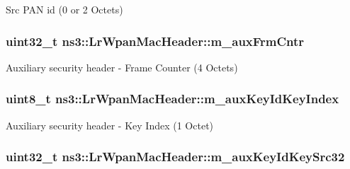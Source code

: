 Src P\+AN id (0 or 2 Octets) 

\subsubsection[{\texorpdfstring{m\+\_\+aux\+Frm\+Cntr}{m_auxFrmCntr}}]{\setlength{\rightskip}{0pt plus 5cm}uint32\+\_\+t ns3\+::\+Lr\+Wpan\+Mac\+Header\+::m\+\_\+aux\+Frm\+Cntr\hspace{0.3cm}{\ttfamily [private]}}\hypertarget{classns3_1_1LrWpanMacHeader_a02e8f1ea52afd29eb1e7566792922fef}{}\label{classns3_1_1LrWpanMacHeader_a02e8f1ea52afd29eb1e7566792922fef}


Auxiliary security header -\/ Frame Counter (4 Octets) 

\subsubsection[{\texorpdfstring{m\+\_\+aux\+Key\+Id\+Key\+Index}{m_auxKeyIdKeyIndex}}]{\setlength{\rightskip}{0pt plus 5cm}uint8\+\_\+t ns3\+::\+Lr\+Wpan\+Mac\+Header\+::m\+\_\+aux\+Key\+Id\+Key\+Index\hspace{0.3cm}{\ttfamily [private]}}\hypertarget{classns3_1_1LrWpanMacHeader_ae072a1f74cf8ff7cb20ae7545e367f7c}{}\label{classns3_1_1LrWpanMacHeader_ae072a1f74cf8ff7cb20ae7545e367f7c}


Auxiliary security header -\/ Key Index (1 Octet) 

\subsubsection[{\texorpdfstring{m\+\_\+aux\+Key\+Id\+Key\+Src32}{m_auxKeyIdKeySrc32}}]{\setlength{\rightskip}{0pt plus 5cm}uint32\+\_\+t ns3\+::\+Lr\+Wpan\+Mac\+Header\+::m\+\_\+aux\+Key\+Id\+Key\+Src32}\hypertarget{classns3_1_1LrWpanMacHeader_a17e5396fcce5becd6042872da64f7987}{}\label{classns3_1_1LrWpanMacHeader_a17e5396fcce5becd6042872da64f7987}


